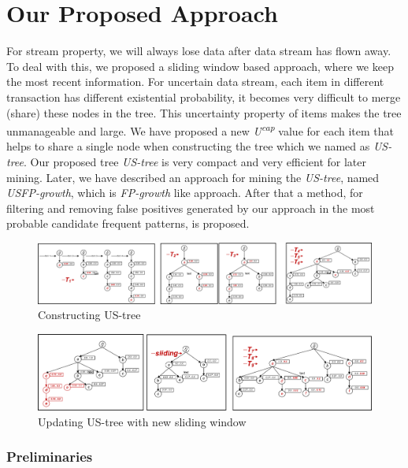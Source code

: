 \documentclass[conference]{IEEEtran}
\begin{document}
\section{Our Proposed Approach}\label{proposedWork}
For stream property, we will always lose data after data stream has flown away. To deal with this, we proposed a sliding window based approach, where we keep the most recent information. For uncertain data stream, each item in different transaction has different existential probability, it becomes very difficult to merge (share) these nodes in the tree. This uncertainty property of items makes the tree unmanageable and large. We have proposed a new \emph{U\textsuperscript{cap}} value for each item that helps to share a single node when constructing the tree which we named as \emph{US-tree}. Our proposed tree \emph{US-tree} is very compact and very efficient for later mining. Later, we have described an approach for mining the \emph{US-tree}, named \emph{USFP-growth}, which is \emph{FP-growth} like approach. After that a method, for filtering and removing false positives generated by our approach in the most probable candidate frequent patterns, is proposed.

\begin{figure}[tb]
  \centering
	\includegraphics[width=\textwidth]{visio/sim_1_6}  
	\caption{Constructing US-tree}%
	\label{figure:t1_6}
\end{figure}

\begin{figure}[tb]
  \centering
	\includegraphics[width=\textwidth]{visio/sim_06_slide_789}  
	\caption{Updating US-tree with new sliding window}%
	\label{figure:t7_9}
\end{figure}

\subsubsection{Preliminaries}
\end{document}
